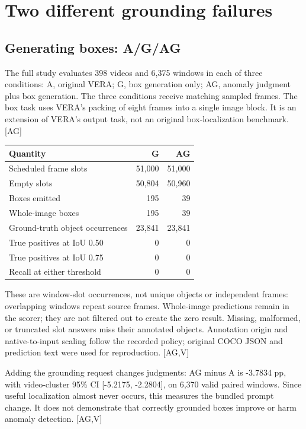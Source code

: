 \documentclass[11pt]{article}
\newcommand{\src}[1]{\textsf{[#1]}}
\begin{document}
\section{Two different grounding failures}
\subsection{Generating boxes: A/G/AG}
The full study evaluates 398 videos and 6,375 windows in each of three conditions: A, original VERA; G, box generation only; AG, anomaly judgment plus box generation. The three conditions receive matching sampled frames. The box task uses VERA's packing of eight frames into a single image block. It is an extension of VERA's output task, not an original box-localization benchmark. \src{AG}

\begin{center}\small\begin{tabular}{@{}lrr@{}}\toprule
Quantity & G & AG\\\midrule
Scheduled frame slots & 51,000 & 51,000\\
Empty slots & 50,804 & 50,960\\
Boxes emitted & 195 & 39\\
Whole-image boxes & 195 & 39\\
Ground-truth object occurrences & 23,841 & 23,841\\
True positives at IoU 0.50 & 0 & 0\\
True positives at IoU 0.75 & 0 & 0\\
Recall at either threshold & 0 & 0\\\bottomrule
\end{tabular}\end{center}

These are window-slot occurrences, not unique objects or independent frames: overlapping windows repeat source frames. Whole-image predictions remain in the scorer; they are not filtered out to create the zero result. Missing, malformed, or truncated slot answers miss their annotated objects. Annotation origin and native-to-input scaling follow the recorded policy; original COCO JSON and prediction text were used for reproduction. \src{AG,V}

Adding the grounding request changes judgments: AG minus A is -3.7834 pp, with video-cluster 95\% CI [-5.2175, -2.2804], on 6,370 valid paired windows. Since useful localization almost never occurs, this measures the bundled prompt change. It does not demonstrate that correctly grounded boxes improve or harm anomaly detection. \src{AG,V}
\end{document}
